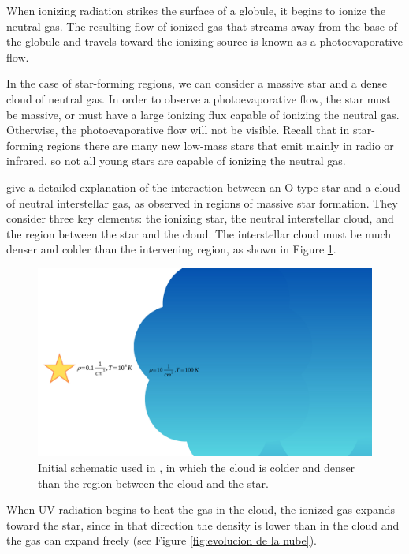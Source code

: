\documentclass{book}
\begin{document}
When ionizing radiation strikes the surface of a globule, it begins to
ionize the neutral gas. The resulting flow of ionized gas that streams
away from the base of the globule and travels toward the ionizing
source is known as a photoevaporative flow.

In the case of star-forming regions, we can consider a massive star
and a dense cloud of neutral gas. In order to observe a
photoevaporative flow, the star must be massive, or must have a large
ionizing flux capable of ionizing the neutral gas. Otherwise, the
photoevaporative flow will not be visible. Recall that in star-forming
regions there are many new low-mass stars that emit mainly in radio or
infrared, so not all young stars are capable of ionizing the neutral
gas.

\cite{OortySpitzer_1955} give a detailed explanation of the
interaction between an O-type star and a cloud of neutral interstellar
gas, as observed in regions of massive star formation. They consider
three key elements: the ionizing star, the neutral interstellar cloud,
and the region between the star and the cloud. The interstellar cloud
must be much denser and colder than the intervening region, as shown
in Figure \ref{kahn_zones}.

\begin{figure}[htb]
    \centering
    \includegraphics[width= \textwidth]{artesanales/ImgFi01-5.pdf}
    \caption{Initial schematic used in \cite{OortySpitzer_1955}, in
      which the cloud is colder and denser than the region between the
      cloud and the star.}
    \label{kahn_zones}
\end{figure}

When UV radiation begins to heat the gas in the cloud, the ionized gas
expands toward the star, since in that direction the density is lower
than in the cloud and the gas can expand freely (see Figure
\ref{fig:evolucion de la nube}).
\end{document}
